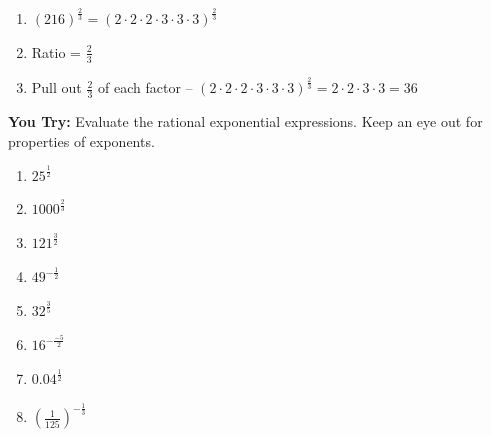 \documentclass[12pt]{article}
\begin{document}
	\begin{enumerate}
	
		\item $\left(216\right)^{\frac{2}{3}}= \left( 2 \cdot 2 \cdot 2 \cdot 3 \cdot 3 \cdot 3\right)^{\frac{2}{3}}$\\
		
		\item Ratio = $\frac{2}{3}$\\
		
		\item Pull out $\frac{2}{3}$ of each factor  -- $\left( 2 \cdot 2 \cdot 2 \cdot 3 \cdot 3 \cdot 3\right)^{\frac{2}{3}}= 2 \cdot 2 \cdot 3 \cdot 3 = 36$
	
	
	\end{enumerate}

\hrulefill

\textbf{You Try:} Evaluate the rational exponential expressions. Keep an eye out for properties of exponents.\\

\begin{multicols}{2}
\begin{enumerate}
		\setlength\itemsep{1cm}

\item $25^{\frac{1}{2}}$\\

\item $1000^{\frac{2}{3}}$\\

\item $121^{\frac{3}{2}}$\\

\item $49^{-\frac{1}{2}}$\\

\item  $32^{\frac{3}{5}}$\\

\item $16^{-\frac{-5}{2}}$\\

\item $0.04^{\frac{1}{2}}$\\

\item $\left(\frac{1}{125}\right)^{-\frac{1}{3}}$

\end{enumerate}
\end{multicols}

\pagebreak
\end{document}
